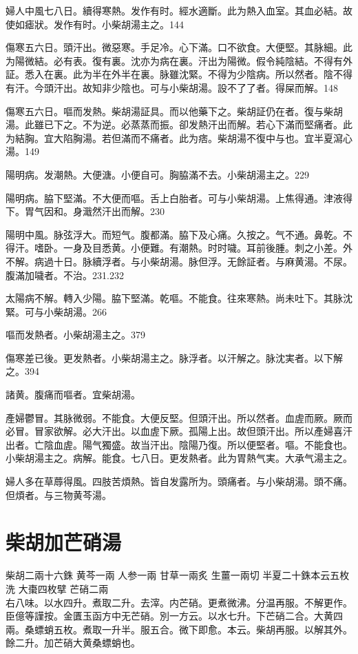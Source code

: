 婦人中風七八日。續得寒熱。发作有时。經水適斷。此为熱入血室。其血必結。故使如瘧狀。发作有时。小柴胡湯主之。144

傷寒五六日。頭汗出。微惡寒。手足冷。心下滿。口不欲食。大便堅。其脉細。此为陽微結。必有表。復有裏。沈亦为病在裏。汗出为陽微。假令純陰結。不得有外証。悉入在裏。此为半在外半在裏。脉雖沈緊。不得为少陰病。所以然者。陰不得有汗。今頭汗出。故知非少陰也。可与{\khaai 小}柴胡湯。設不了了者。得屎而解。148

傷寒五六日。嘔而发熱。柴胡湯証具。而以他藥下之。柴胡証仍在者。復与柴胡湯。此雖已下之。不为逆。必蒸蒸而振。卻发熱汗出而解。若心下滿而堅痛者。此为結胸。宜大陷胸湯。若但滿而不痛者。此为痞。柴胡{\khaai 湯}不復中与也。宜半夏瀉心湯。149

陽明病。发潮熱。大便溏。小便自可。胸脇滿不去。小柴胡湯主之。229

陽明病。脇下堅滿。不大便而嘔。舌上{\khaai 白}胎者。可与小柴胡湯。上焦得通。津液得下。胃气因和。身濈然汗出而解。230

陽明中風。脉弦浮大。而短气。腹都滿。脇下及心痛。久按之。气不通。鼻乾。不得汗。嗜卧。一身及目悉黄。小便難。有潮熱。时时噦。耳前後腫。刺之小差。外不解。病過十日。脉續浮者。与{\khaai 小}柴胡湯。脉但浮。无餘証者。与麻黄湯。不尿。腹滿加噦者。不治。231.232

太陽病不解。轉入少陽。脇下堅滿。乾嘔。不能食。往來寒熱。尚未吐下。其脉沈緊。可与小柴胡湯。266

嘔而发熱者。小柴胡湯主之。379

傷寒差已後。更发熱者。小柴胡湯主之。脉浮者。以汗解之。脉沈実者。以下解之。394

諸黄。腹痛而嘔者。宜柴胡湯。

產婦鬱{\khaai 冒}。其脉微弱。不能食。大便反堅。但頭汗出。所以然者。血虗而厥。厥而必冒。冒家欲解。必大汗出。以血虗下厥。孤陽上出。故但頭汗出。所以產婦喜汗出者。亡陰血虗。陽气獨盛。故当汗出。陰陽乃復。所以便堅者。嘔。不能食也。小柴胡湯主之。病解。能食。七八日。更发熱者。此为胃熱气実。大承气湯主之。

婦人多在草蓐得風。四肢苦煩熱。皆自发露所为。頭痛者。与小柴胡湯。頭不痛。但煩者。与三物黄芩湯。

\section{柴胡加芒硝湯}

柴胡{\scriptsize 二兩十六銖} 黄芩{\scriptsize 一兩} 人参{\scriptsize 一兩} 甘草{\scriptsize 一兩炙} 生薑{\scriptsize 一兩切} 半夏{\scriptsize 二十銖本云五枚洗} 大棗{\scriptsize 四枚擘} 芒硝{\scriptsize 二兩}\\
右八味。以水四升。煮取二升。去滓。内芒硝。更煮微沸。分温再服。不解更作。{\scriptsize 臣億等謹按。金匱玉函方中无芒硝。別一方云。以水七升。下芒硝二合。大黄四兩。桑螵蛸五枚。煮取一升半。服五合。微下即愈。本云。柴胡再服。以解其外。餘二升。加芒硝大黄桑螵蛸也。}

